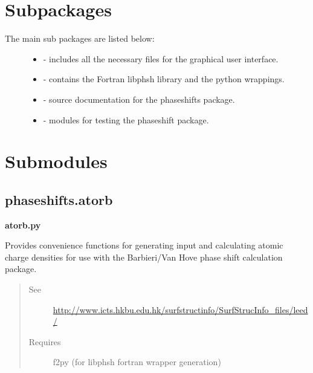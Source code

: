 \documentclass[letterpaper,10pt,english]{sphinxmanual}
\begin{document}
\section{Subpackages}
\label{modules:subpackages}\begin{description}
\item[{The main sub packages are listed below:}] \leavevmode\begin{itemize}
\item {} 
 - includes all the necessary files for the graphical user interface.

\item {} 
 - contains the Fortran libphsh library and the python wrappings.

\item {} 
 - source documentation for the phaseshifts package.

\item {} 
 - modules for testing the phaseshift package.

\end{itemize}

\end{description}


\section{Submodules}
\label{modules:submodules}

\subsection{phaseshifts.atorb}
\label{modules:module-phaseshifts.atorb}\label{modules:phaseshifts-atorb}
\textbf{atorb.py}

Provides convenience functions for generating input and calculating 
atomic charge densities for use with the Barbieri/Van Hove phase 
shift calculation package.
\begin{quote}\begin{description}
\item[{See}] \leavevmode
\href{http://www.icts.hkbu.edu.hk/surfstructinfo/SurfStrucInfo\_files/leed/}{http://www.icts.hkbu.edu.hk/surfstructinfo/SurfStrucInfo\_files/leed/}

\item[{Requires}] \leavevmode
f2py (for libphsh fortran wrapper generation)

\end{description}\end{quote}
\end{document}

